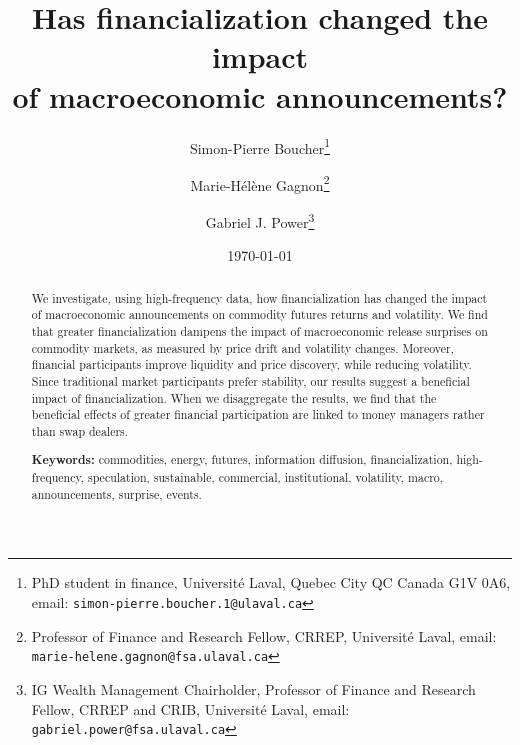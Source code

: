\documentclass[12pt]{article}
\title{\textbf{Has financialization changed the impact\\ of macroeconomic announcements?}}
\author{Simon-Pierre Boucher\footnote{PhD student in finance, Université Laval, Quebec City QC Canada G1V 0A6, email:   \texttt{simon-pierre.boucher.1@ulaval.ca}}\and Marie-H{\'e}l{\`e}ne Gagnon\footnote{Professor of Finance and Research Fellow, CRREP, Université Laval, email: \texttt{marie-helene.gagnon@fsa.ulaval.ca}}\and Gabriel J. Power\footnote{IG Wealth Management Chairholder, Professor of Finance and Research Fellow, CRREP and CRIB, Université Laval, email:   \texttt{gabriel.power@fsa.ulaval.ca}}}
\date{\today}
\begin{document}
\begin{titlepage}
\maketitle

\singlespacing

\begin{abstract}
\noindent 
We investigate, using high-frequency data, how financialization has changed the impact of macroeconomic announcements on commodity futures returns and volatility. We find that greater financialization dampens the impact of macroeconomic release surprises on commodity markets, as measured by price drift and volatility changes. Moreover, financial participants improve liquidity and price discovery, while reducing volatility. Since traditional market participants prefer stability, our results suggest a beneficial impact of financialization. When we disaggregate the results, we find that the beneficial effects of greater financial participation are linked to money managers rather than swap dealers. 

\vspace{0.2in}
\noindent\textbf{Keywords:} commodities, energy, futures,  information diffusion, financialization, high-frequency, speculation, sustainable, commercial, institutional, volatility, macro, announcements, surprise, events.\\


\bigskip
\end{abstract}
\setcounter{page}{0}
\thispagestyle{empty}
\end{titlepage}
\pagebreak \newpage



\doublespacing








\small

\newpage






\end{document}
